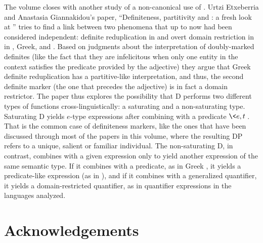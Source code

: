 \documentclass[output=paper]{langsci/langscibook}
\begin{document}
The volume closes with another study of a non-canonical use of . Urtzi Etxeberria and Anastasia Giannakidou’s paper, “Definiteness, partitivity and : a fresh look at ” tries to find a link between two phenomena that up to now had been considered independent: definite reduplication in  and overt domain restriction in  in , Greek,  and . Based on judgments about the interpretation of doubly-marked definites (like the fact that they are infelicitous when only one entity in the context satisfies the predicate provided by the adjective) they argue that Greek definite reduplication has a partitive-like interpretation, and thus, the second definite marker (the one that precedes the adjective) is in fact a domain restrictor. The paper thus explores the possibility that D performs two different types of functions cross-linguistically: a saturating and a non-saturating type. Saturating D yields $e$-type expressions after combining with a predicate $ \<e, t\> $. That is the common case of definiteness markers, like the ones that have been discussed through most of the papers in this volume, where the resulting DP refers to a unique, salient or familiar individual. The non-saturating D, in contrast, combines with a given expression only to yield another expression of the same semantic type. If it combines with a predicate, as in Greek , it yields a predicate-like expression (as in  ), and if it combines with a generalized quantifier, it yields a domain-restricted quantifier, as in quantifier expressions in the languages analyzed.

\section{Acknowledgements}
\end{document}
